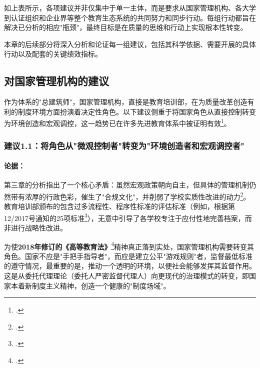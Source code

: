 \vspace{0.5cm}

如上表所示，各项建议并非仅集中于单一主体，而是要求从国家管理机构、各大学到认证组织和企业界等整个教育生态系统的共同努力和同步行动。每组行动都旨在解决已分析的相应"瓶颈"，最终目标是在质量的思维和行动上实现根本性转变。

本章的后续部分将深入分析和论证每一组建议，包括其科学依据、需要开展的具体行动以及配套的关键绩效指标。

\subsection{对国家管理机构的建议}
\label{subsec:khuyen_nghi_qlnn_detailed}

作为体系的"总建筑师"，国家管理机构，直接是教育培训部，在为质量改革创造有利的制度环境方面扮演着决定性角色。以下建议侧重于将国家角色从直接控制转变为环境创造和宏观调控，这一趋势已在许多先进教育体系中被证明有效\footcite{OECD_PolicyToAction}。

\subsubsection{建议1.1：将角色从"微观控制者"转变为"环境创造者和宏观调控者"}

\paragraph{论据：}
第三章的分析指出了一个核心矛盾：虽然宏观政策朝向自主，但具体的管理机制仍然带有浓厚的行政色彩，催生了"合规文化"，并削弱了学校实质性改进的动力\footcite{pham2021governance}。教育培训部颁布的包含过多流程性、程序性标准的评估标准（例如，根据第12/2017号通知的25项标准\footcite{tt12_2017_bgddt}），无意中引导了各学校专注于应付性地完善档案，而非进行战略性改进。

为使\textbf{2018年修订的《高等教育法》}\footcite{luatvn_gddh_2018}精神真正落到实处，国家管理机构需要转变其角色。国家不应是"手把手指导者"，而应是建立公平"游戏规则"者，监督最低标准的遵守情况，最重要的是，推动一个透明的环境，以便社会能够发挥其监督作用。这是从委托代理理论（委托人严密监督代理人）向更现代的治理模式的转变，即国家本着新制度主义精神，创造一个健康的"制度场域"。

